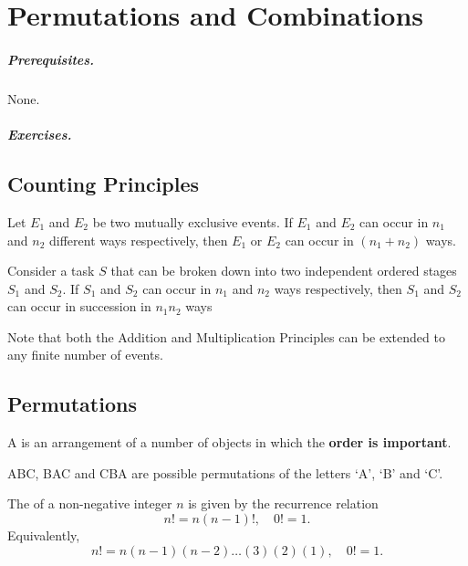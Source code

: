 \chapter{Permutations and Combinations}\label{sec:Permutations-and-Combinations}

\paragraph{Prerequisites.} None.
\paragraph{Exercises.} 

\section{Counting Principles}

\begin{fact}
    Let $E_1$ and $E_2$ be two mutually exclusive events. If $E_1$ and $E_2$ can occur in $n_1$ and $n_2$ different ways respectively, then $E_1$ or $E_2$ can occur in $(n_1 + n_2)$ ways.
\end{fact}

\begin{fact}
    Consider a task $S$ that can be broken down into two independent ordered stages $S_1$ and $S_2$. If $S_1$ and $S_2$ can occur in $n_1$ and $n_2$ ways respectively, then $S_1$ and $S_2$ can occur in succession in $n_1 n_2$ ways
\end{fact}

Note that both the Addition and Multiplication Principles can be extended to any finite number of events.

\section{Permutations}

\begin{definition}
    A  is an arrangement of a number of objects in which the \textbf{order is important}.
\end{definition}

\begin{example}
    ABC, BAC and CBA are possible permutations of the letters `A', `B' and `C'.
\end{example}

\begin{definition}[Factorial]
    The  of a non-negative integer $n$ is given by the recurrence relation \[n! = n(n-1)!, \quad 0! = 1.\] Equivalently, \[n! = n(n-1)(n-2)\dots(3)(2)(1), \quad 0! = 1.\]
\end{definition}

